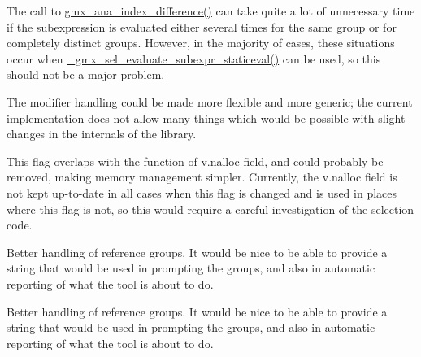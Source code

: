 
\begin{DoxyRefList}
\item[\label{todo__todo000005}%
\hypertarget{todo__todo000005}{}%
\-Member \hyperlink{evaluate_8h_ad4649d8e25fbf50a6b917ee188f849ff}{\-\_\-gmx\-\_\-sel\-\_\-evaluate\-\_\-subexpr} (\hyperlink{structgmx__sel__evaluate__t}{gmx\-\_\-sel\-\_\-evaluate\-\_\-t} $\ast$data, \hyperlink{structt__selelem}{t\-\_\-selelem} $\ast$sel, \hyperlink{structgmx__ana__index__t}{gmx\-\_\-ana\-\_\-index\-\_\-t} $\ast$g)]\-The call to \hyperlink{include_2indexutil_8h_a36418762a1d83eed47840281d779e312}{gmx\-\_\-ana\-\_\-index\-\_\-difference()} can take quite a lot of unnecessary time if the subexpression is evaluated either several times for the same group or for completely distinct groups. \-However, in the majority of cases, these situations occur when \hyperlink{evaluate_8c_a4f113a86ee0dfa0ec3f7ba3ad70661b6}{\-\_\-gmx\-\_\-sel\-\_\-evaluate\-\_\-subexpr\-\_\-staticeval()} can be used, so this should not be a major problem.  
\item[\label{todo__todo000001}%
\hypertarget{todo__todo000001}{}%
\-Page \hyperlink{selmethods}{\-Custom selection methods} ]\-The modifier handling could be made more flexible and more generic; the current implementation does not allow many things which would be possible with slight changes in the internals of the library. 
\item[\label{todo__todo000006}%
\hypertarget{todo__todo000006}{}%
\-Member \hyperlink{selelem_8h_a6fee1910b915d2f6e873f134e297ab47}{\-S\-E\-L\-\_\-\-A\-L\-L\-O\-C\-V\-A\-L} ]\-This flag overlaps with the function of {\ttfamily v.\-nalloc} field, and could probably be removed, making memory management simpler. \-Currently, the {\ttfamily v.\-nalloc} field is not kept up-\/to-\/date in all cases when this flag is changed and is used in places where this flag is not, so this would require a careful investigation of the selection code.  
\item[\label{todo__todo000002}%
\hypertarget{todo__todo000002}{}%
\-File \hyperlink{include_2trajana_8h}{trajana.h} ]\-Better handling of reference groups. \-It would be nice to be able to provide a string that would be used in prompting the groups, and also in automatic reporting of what the tool is about to do. 
\item[\label{todo__todo000004}%
\hypertarget{todo__todo000004}{}%
\-File \hyperlink{share_2template_2gromacs_2trajana_8h}{trajana.h} ]\-Better handling of reference groups. \-It would be nice to be able to provide a string that would be used in prompting the groups, and also in automatic reporting of what the tool is about to do.
\end{DoxyRefList}